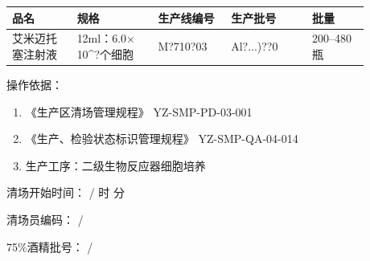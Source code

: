\documentclass[UTF8,10pt,a4paper,fontset=fandol]{ctexart}
\newcommand{\fieldvalue}[1]{#1}
\newcommand{\handwritten}[1]{#1}
\begin{document}
\noindent
\begin{tabular}{|p{0.16\linewidth}|p{0.20\linewidth}|p{0.18\linewidth}|p{0.20\linewidth}|p{0.14\linewidth}|}
\hline
品名 & 规格 & 生产线编号 & 生产批号 & 批量 \\
\hline
\fieldvalue{艾米迈托塞注射液}
&
\fieldvalue{12ml：6.0$\times$10^{?}个细胞}
&
\fieldvalue{\handwritten{M?710?03}}
&
\fieldvalue{\handwritten{Al?...)??0}}
&
\fieldvalue{200--480 瓶}
\\
\hline
\end{tabular}

\medskip

\noindent
操作依据：

\begin{enumerate}
    \item 《生产区清场管理规程》 \hfill YZ-SMP-PD-03-001
    \item 《生产、检验状态标识管理规程》 \hfill YZ-SMP-QA-04-014
    \item 生产工序：二级生物反应器细胞培养
\end{enumerate}

\noindent
清场开始时间：
\fieldvalue{\handwritten{/}} 时 \underline{\hspace{1.5em}} 分

\noindent
清场员编码：
\fieldvalue{\handwritten{/}}

\hfill
75\%酒精批号：
\fieldvalue{\handwritten{/}}

\medskip
\end{document}
